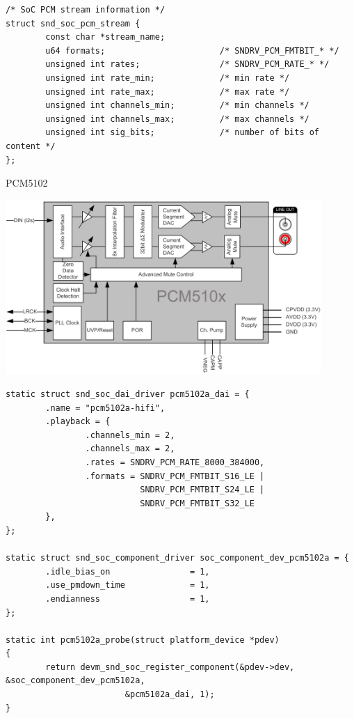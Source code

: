 \begin{frame}[fragile]{}
  \begin{block}{}
    \fontsize{9}{9}\selectfont
    \begin{verbatim}
/* SoC PCM stream information */
struct snd_soc_pcm_stream {
        const char *stream_name;
        u64 formats;                       /* SNDRV_PCM_FMTBIT_* */
        unsigned int rates;                /* SNDRV_PCM_RATE_* */
        unsigned int rate_min;             /* min rate */
        unsigned int rate_max;             /* max rate */
        unsigned int channels_min;         /* min channels */
        unsigned int channels_max;         /* max channels */
        unsigned int sig_bits;             /* number of bits of content */
};
    \end{verbatim}
  \end{block}
\end{frame}

\begin{frame}[fragile]{PCM5102}
  \begin{center}
  \includegraphics[width=0.9\textwidth]{slides/audio-asoc-codec/pcm510x.png}
  \end{center}
\end{frame}

\begin{frame}[fragile]{}
  \begin{block}{}
    \fontsize{8}{8}\selectfont
    \begin{verbatim}
static struct snd_soc_dai_driver pcm5102a_dai = {
        .name = "pcm5102a-hifi",
        .playback = {
                .channels_min = 2,
                .channels_max = 2,
                .rates = SNDRV_PCM_RATE_8000_384000,
                .formats = SNDRV_PCM_FMTBIT_S16_LE |
                           SNDRV_PCM_FMTBIT_S24_LE |
                           SNDRV_PCM_FMTBIT_S32_LE
        },
};

static struct snd_soc_component_driver soc_component_dev_pcm5102a = {
        .idle_bias_on                = 1,
        .use_pmdown_time             = 1,
        .endianness                  = 1,
};

static int pcm5102a_probe(struct platform_device *pdev)
{
        return devm_snd_soc_register_component(&pdev->dev, &soc_component_dev_pcm5102a,
                        &pcm5102a_dai, 1);
}
    \end{verbatim}
  \end{block}
\end{frame}

